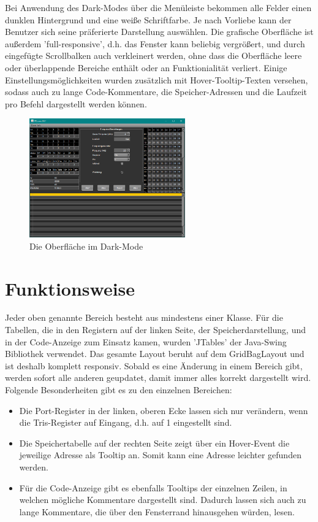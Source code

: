 Bei Anwendung des Dark-Modes über die Menüleiste bekommen alle Felder einen dunklen Hintergrund und eine weiße Schriftfarbe. Je nach Vorliebe kann der Benutzer sich seine präferierte Darstellung auswählen. Die grafische Oberfläche ist außerdem 'full-responsive', d.h. das Fenster kann beliebig vergrößert, und durch eingefügte Scrollbalken auch verkleinert werden, ohne dass die Oberfläche leere oder überlappende Bereiche enthält oder an Funktionialität verliert. 
Einige Einstellungsmöglichkeiten wurden zusätzlich mit Hover-Tooltip-Texten versehen, sodass auch zu lange Code-Kommentare, die Speicher-Adressen und die Laufzeit pro Befehl dargestellt werden können. 
\begin{figure}[ht]
	\centering
	\includegraphics[width=0.6\textwidth]{img/gui-dark}
	\caption{Die Oberfläche im Dark-Mode}
	\label{gui-dark}
\end{figure}
\section{Funktionsweise}
Jeder oben genannte Bereich besteht aus mindestens einer Klasse. Für die Tabellen, die in den Registern auf der linken Seite, der Speicherdarstellung, und in der Code-Anzeige zum Einsatz kamen, wurden 'JTables' der Java-Swing Bibliothek verwendet. Das gesamte Layout beruht auf dem GridBagLayout und ist deshalb komplett responsiv. Sobald es eine Änderung in einem Bereich gibt, werden sofort alle anderen geupdatet, damit immer alles korrekt dargestellt wird. Folgende Besonderheiten gibt es zu den einzelnen Bereichen:
\begin{itemize}
	\item Die Port-Register in der linken, oberen Ecke lassen sich nur verändern, wenn die Tris-Register auf Eingang, d.h. auf 1 eingestellt sind.
	\item Die Speichertabelle auf der rechten Seite zeigt über ein Hover-Event die jeweilige Adresse als Tooltip an. Somit kann eine Adresse leichter gefunden werden. 
	\item Für die Code-Anzeige gibt es ebenfalls Tooltips der einzelnen Zeilen, in welchen mögliche Kommentare dargestellt sind. Dadurch lassen sich auch zu lange Kommentare, die über den Fensterrand hinausgehen würden, lesen. 
\end{itemize}

